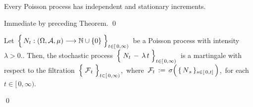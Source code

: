 
\vskip 0.5cm
\begin{corollary}
\mbox{}
\vskip 0.15cm
\noindent
Every Poisson process has independent and stationary increments.
\end{corollary}
\proof
Immediate by preceding Theorem.
\qed


\vskip 1.0cm
\begin{theorem}
\mbox{}
\vskip 0.15cm
\noindent
Let
\,$\left\{\,N_{t} : (\Omega,\mathcal{A},\mu) \overset{{\color{white}-}}{\longrightarrow} \N\cup\{0\} \;\right\}_{t \in [\,0,\infty)}$\,
be a Poisson process with intensity \,$\lambda > 0$..
Then, the stochastic process
\,$\left\{\;N_{t}\,\overset{{\color{white}.}}{-}\,\lambda\,t\;\right\}_{t\in[\,0,\infty)}$\,
is a martingale with respect to the filtration
\,$\left\{\;\overset{{\color{white}.}}{\mathcal{F}}_{t}\;\right\}_{t\in[\,0,\infty)}$,\,
where
\,$\mathcal{F}_{t} \,:=\, \sigma\!\left(\,\{\,\overset{{\color{white}.}}{N}_{s}\,\}_{s\in[\,0,t]}\,\right)$,\,
for each \,$t \in [\,0,\infty)$.
\end{theorem}
\proof

\qed


\renewcommand{\theenumi}{\roman{enumi}}
\renewcommand{\labelenumi}{\textnormal{(\theenumi)}$\;\;$}

